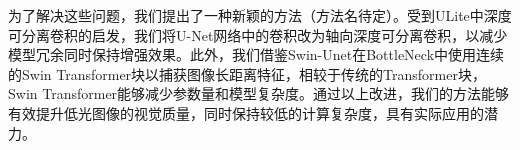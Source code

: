 \documentclass[a4paper, 10pt]{article}
\begin{document}
%		
		
		为了解决这些问题，我们提出了一种新颖的方法（方法名待定）。受到ULite\cite{dinh20231m}中深度可分离卷积的启发，我们将U-Net网络中的卷积改为轴向深度可分离卷积，以减少模型冗余同时保持增强效果。此外，我们借鉴Swin-Unet\cite{cao2022swin}在BottleNeck中使用连续的Swin Transformer块以捕获图像长距离特征，相较于传统的Transformer块，Swin Transformer能够减少参数量和模型复杂度。通过以上改进，我们的方法能够有效提升低光图像的视觉质量，同时保持较低的计算复杂度，具有实际应用的潜力。
		
		
\end{document}
